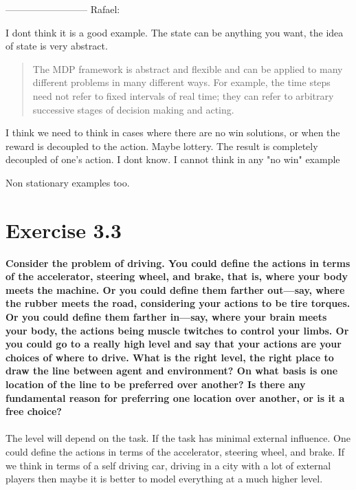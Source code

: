 \documentclass[a4paper,11pt]{article}
\numberwithin{equation}{section}
\theoremstyle{remark}
\begin{document}
--------------------------
Rafael:

I dont think it is a good example. The state can be anything you want, the idea of state is very abstract. 
\begin{quote}
The MDP framework is abstract and flexible and can be applied to many different
problems in many different ways. For example, the time steps need not refer to fixed
intervals of real time; they can refer to arbitrary successive stages of decision making
and acting. 
\end{quote}

I think we need to think in cases where there are no win solutions, or when the reward is decoupled to the action. 
Maybe lottery. The result is completely decoupled of one's action. I dont know.
I cannot think in any "no win" example 

Non stationary examples too. 


\section{Exercise 3.3}
\textbf{
Consider the problem of driving. You could define the actions in terms of
the accelerator, steering wheel, and brake, that is, where your body meets the machine.
Or you could define them farther out—say, where the rubber meets the road, considering
your actions to be tire torques. Or you could define them farther in—say, where your
brain meets your body, the actions being muscle twitches to control your limbs. Or you
could go to a really high level and say that your actions are your choices of where to drive.
What is the right level, the right place to draw the line between agent and environment?
On what basis is one location of the line to be preferred over another? Is there any
fundamental reason for preferring one location over another, or is it a free choice?
}
\\ \\

The level will depend on the task. If the task has minimal external influence. One could define the actions in terms of
the accelerator, steering wheel, and brake. If we think in terms of a self driving car, driving in a city with a lot of external players then
maybe it is better to model everything at a much higher level. 
\end{document}
